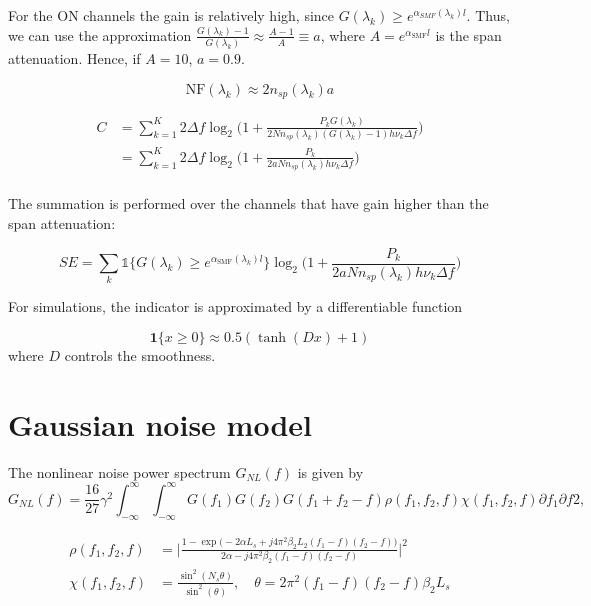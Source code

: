 \documentclass[a4paper]{article}
\begin{document}
For the ON channels the gain is relatively high, since $G(\lambda_k) \geq e^{\alpha_{SMF}(\lambda_k)l}$. Thus, we can use the approximation $\frac{G(\lambda_k)-1}{G(\lambda_k)} \approx \frac{A-1}{A} \equiv a$, where $A = e^{\alpha_{\text{SMF}}l}$ is the span attenuation. Hence, if $A = 10$, $a = 0.9$. 

\begin{equation} \label{eq:NF}
\mathrm{NF}(\lambda_k) \approx 2n_{sp}(\lambda_k)a
\end{equation}

\begin{align} \nonumber
C &= \sum_{k = 1}^{K} 2\Delta f\log_2\Bigg(1 + \frac{P_kG(\lambda_k)}{2Nn_{sp}(\lambda_k)(G(\lambda_k) - 1)h\nu_k\Delta f}\Bigg) \\
&= \sum_{k = 1}^{K} 2\Delta f\log_2\Bigg(1 + \frac{P_k}{2aNn_{sp}(\lambda_k)h\nu_k\Delta f}\Bigg) \\
\end{align}


The summation is performed over the channels that have gain higher than the span attenuation:

\begin{equation}
SE =\sum_{k} \mathds{1}\{G(\lambda_k) \geq e^{\alpha_{\text{SMF}}(\lambda_k)l}\}\log_2\bigg(1 + \frac{P_k}{2aNn_{sp}(\lambda_k)h\nu_k\Delta f}\bigg) 
\end{equation}

For simulations, the indicator is approximated by a differentiable function

\begin{equation}
	\bm{1}\{x \geq 0\} \approx 0.5(\tanh(Dx) + 1)
\end{equation}
where $D$ controls the smoothness.

\section{Gaussian noise model}

The nonlinear noise power spectrum $G_{NL}(f)$ is given by \cite{Poggiolini2012}
\begin{equation}
	G_{NL}(f) = \frac{16}{27}\gamma^2\int_{-\infty}^{\infty}\int_{-\infty}^{\infty}G(f_1)G(f_2)G(f_1+f_2-f)\rho(f_1, f_2, f)\chi(f_1, f_2, f)\partial f_1\partial f2,
\end{equation}

\begin{align}
	\rho(f_1, f_2, f) &= \Bigg|\frac{1 - \exp\Big(-2\alpha L_s + j4\pi^2\beta_2L_2(f_1-f)(f_2-f)\Big)}{2\alpha - j4\pi^2\beta_2(f_1-f)(f_2-f)}\Bigg|^2 \\
	\chi(f_1, f_2, f) &= \frac{\sin^2(N_s\theta)}{\sin^2(\theta)}, \quad \theta = 2\pi^2(f_1-f)(f_2-f)\beta_2L_s
\end{align}
\end{document}
